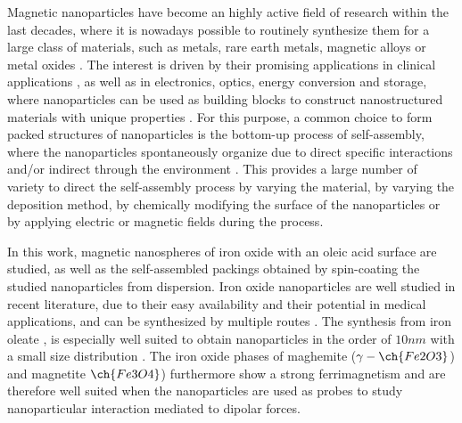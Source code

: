 \documentclass[\main/dresen_thesis.tex]{subfiles}
\begin{document}
  Magnetic nanoparticles have become an highly active field of research within the last decades, where it is nowadays possible to routinely synthesize them for a large class of materials, such as metals, rare earth metals, magnetic alloys or metal oxides \cite{Gubin_2005_Magne}.
  The interest is driven by their promising applications in clinical applications \cite{Thanh_2012_Magne}, as well as in electronics, optics, energy conversion and storage, where nanoparticles can be used as building blocks to construct nanostructured materials with unique properties \cite{Singamaneni_2011_Magne}.
  For this purpose, a common choice to form packed structures of nanoparticles is the bottom-up process of self-assembly, where the nanoparticles spontaneously organize due to direct specific interactions and/or indirect through the environment \cite{Grzelczak_2010_direc, Whitesides_2002_Selfa}.
  This provides a large number of variety to direct the self-assembly process \ie by varying the material, by varying the deposition method, by chemically modifying the surface of the nanoparticles or by applying electric or magnetic fields during the process.

  In this work, magnetic nanospheres of iron oxide with an oleic acid surface are studied, as well as the self-assembled packings obtained by spin-coating the studied nanoparticles from dispersion.
  Iron oxide nanoparticles are well studied in recent literature, due to their easy availability and their potential in medical applications, and can be synthesized by multiple routes \cite{Laurent_2008_Magne}.
  The synthesis from iron oleate \cite{Hyeon_2003_Chemi}, is especially well suited to obtain nanoparticles in the order of $10 \unit{nm}$ with a small size distribution \cite{Wetterskog_2014_Preci}.
  The iron oxide phases of maghemite ($\gamma-\ch{Fe2O3}$) and magnetite $\ch{Fe3O4}$) furthermore show a strong ferrimagnetism and are therefore well suited when the nanoparticles are used as probes to study nanoparticular interaction mediated to dipolar forces.
\end{document}
